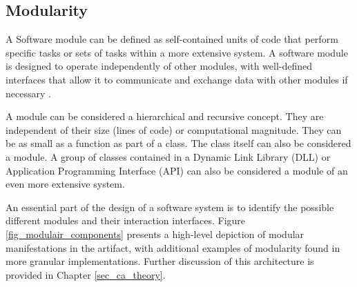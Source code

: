 \subsection{Modularity}

A Software module can be defined as self-contained units of code that perform specific
tasks or sets of tasks within a more extensive system. A software module is designed to operate
independently of other modules, with well-defined interfaces that allow it to communicate
and exchange data with other modules if necessary \autocite[22]{mannaert_normalized_2016}.

A module can be considered a hierarchical and recursive concept. They are independent of
their size (lines of code) or computational magnitude. They can be as small as a function
as part of a class. The class itself can also be considered a module. A group of classes
contained in a Dynamic Link Library (DLL) or Application Programming Interface (API) can
also be considered a module of an even more extensive system. 

An essential part of the design of a software system is to identify the possible different
modules and their interaction interfaces. Figure \ref{fig_modulair_components} presents a
high-level depiction of modular manifestations in the artifact, with additional examples
of modularity found in more granular implementations. Further discussion of this
architecture is provided in Chapter \ref{sec_ca_theory}.